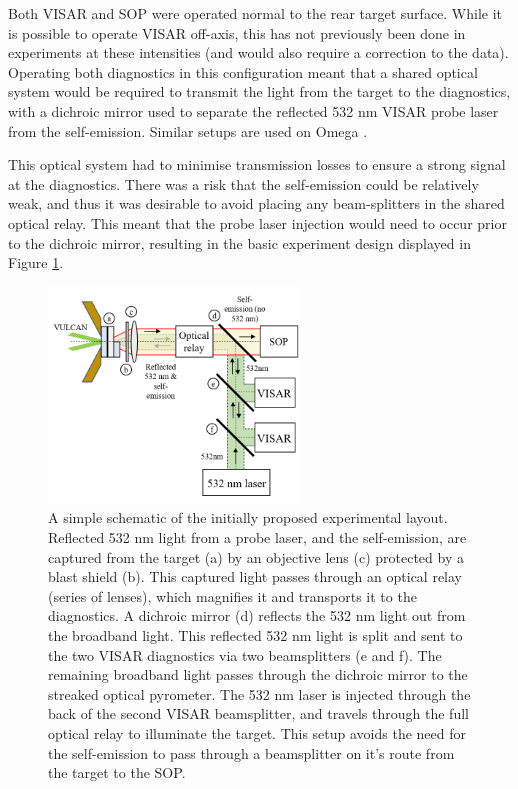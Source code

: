 Both VISAR and SOP were operated normal to the rear target surface. While it is possible to operate VISAR off-axis, this has not previously been done in experiments at these intensities (and would also require a correction to the data). Operating both diagnostics in this configuration meant that a shared optical system would be required to transmit the light from the target to the diagnostics, with a dichroic mirror used to separate the reflected 532 nm VISAR probe laser from the self-emission. Similar setups are used on Omega \cite{Miller2007, Gregor2016}.

This optical system had to minimise transmission losses to ensure a strong signal at the diagnostics. There was a risk that the self-emission could be relatively weak, and thus it was desirable to avoid placing any beam-splitters in the shared optical relay. This meant that the probe laser injection would need to occur prior to the dichroic mirror, resulting in the basic experiment design displayed in Figure \ref{fig:Simple experiment schematic}.

\begin{figure}
  \centering
\includegraphics[width=0.6\textwidth]{figures/Experiment/SchematicsWithBackgrounds/BasicSchematic.png}%
\caption{\label{fig:Simple experiment schematic} A simple schematic of the initially proposed experimental layout. Reflected 532 nm light from a probe laser, and the self-emission, are captured from the target (a) by an objective lens (c) protected by a blast shield (b). This captured light passes through an optical relay (series of lenses), which magnifies it and transports it to the diagnostics. A dichroic mirror (d) reflects the 532 nm light out from the broadband light. This reflected 532 nm light is split and sent to the two VISAR diagnostics via two beamsplitters (e and f). The remaining broadband light passes through the dichroic mirror to the streaked optical pyrometer. The 532 nm laser is injected through the back of the second VISAR beamsplitter, and travels through the full optical relay to illuminate the target. This setup avoids the need for the self-emission to pass through a beamsplitter on it's route from the target to the SOP.  }
\end{figure}



